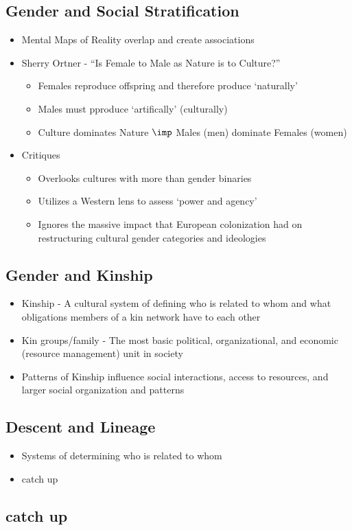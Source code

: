 \documentclass[a4paper]{article}
\begin{document}
\subsection{Gender and Social Stratification} \begin{itemize}
  \item Mental Maps of Reality overlap and create associations
\end{itemize}
\begin{itemize}
  \item Sherry Ortner - ``Is Female to Male as Nature is to Culture?''
  \begin{itemize}
    \item Females reproduce offspring and therefore produce `naturally'
    \item Males must pproduce `artifically' (culturally)
    \item Culture dominates Nature $\imp$ Males (men) dominate Females (women)
  \end{itemize}
\item Critiques
\begin{itemize}
    \item Overlooks cultures with more than gender binaries
    \item Utilizes a Western lens to assess `power and agency'
    \item Ignores the massive impact that European colonization had on restructuring cultural gender categories and ideologies
  \end{itemize}
\end{itemize}

\subsection{Gender and Kinship}
\begin{itemize}
  \item Kinship - A cultural system of defining who is related to whom and what obligations members of a kin network have to each other
  \item Kin groups/family - The most basic political, organizational, and economic (resource management) unit in society
  \item Patterns of Kinship influence social interactions, access to resources, and larger social organization and patterns
\end{itemize}

\subsection{Descent and Lineage}
\begin{itemize}
  \item Systems of determining who is related to whom
  \item catch up
\end{itemize}
\subsection{catch up}
\end{document}
